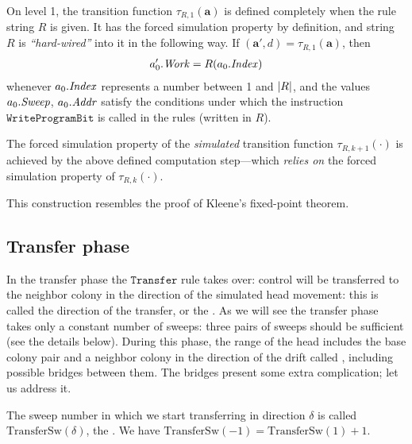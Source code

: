\documentclass[11pt]{memoir}
\theoremstyle{definition} %
\renewcommand{\vek}[1]{\mathbf{#1}}
\newcommand{\fld}[1]{\ensuremath{\textit{#1\/}}}
\newcommand{\rul}[1]{\ensuremath{\texttt{#1}}}
\newcommand{\va}{\vek{a}}
\newcommand{\Addr}{\fld{Addr}}
\newcommand{\Index}{\fld{Index}}
\newcommand{\Sweep}{\fld{Sweep}}
\newcommand{\Work}{\fld{Work}}
\newcommand{\TransferSw}{\mathrm{TransferSw}}
\newcommand{\Transfer}{\rul{Transfer}}
\newcommand{\WriteProgramBit}{\rul{WriteProgramBit}}
\begin{document}
\begin{itemize}
  \begin{sloppypar}
\item On level 1, the transition function \( \tau_{R,1}(\va) \) is defined completely
when the rule string \( R \) is given.
It has the forced simulation property by definition, and
string \( R \) is \emph{``hard-wired''} into it in the following way.
If \( (\va',d)=\tau_{R,1}(\va) \), then
\begin{align*}
  a'_{0}.\Work=R(a_{0}.\Index)
\end{align*}
whenever \( a_{0}.\Index \) represents a number between 1 and \( \lvert R \rvert \),
and the values \( a_{0}.\Sweep \), \( a_{0}.\Addr \) satisfy the conditions
under which the instruction \( \WriteProgramBit \) is 
called in the rules (written in \( R \)).
      \end{sloppypar}

      \begin{sloppypar}
\item The forced simulation property of the \emph{simulated}
transition function \( \tau_{R,k+1}(\cdot) \) is 
achieved by the above defined computation 
step---which \emph{relies on} the forced simulation property of \( \tau_{R,k}(\cdot) \).
              \end{sloppypar}
\end{itemize}

\begin{remark}
This construction resembles the proof of Kleene's fixed-point theorem.
\end{remark}

\subsection{Transfer phase}\label{sec:TransferPhase}

In the transfer phase the \( \Transfer \) rule takes over: control will be transferred to the
neighbor colony in the direction of the simulated head movement: this is
called the direction of the transfer, or the .
As we will see the transfer phase takes only a constant number of sweeps:
three pairs of sweeps should be sufficient (see the details below).
During this phase, the range of the head
includes the base colony pair and a neighbor colony
in the direction of the drift called , including possible bridges between them.
The bridges present some extra complication; let us address it.

\begin{sloppypar}
The sweep number in which we start transferring in direction \( \delta \) is called
\( \TransferSw(\delta) \), the .
We have \( \TransferSw(-1) =\TransferSw(1)+1 \).  
\end{sloppypar}
\end{document}
